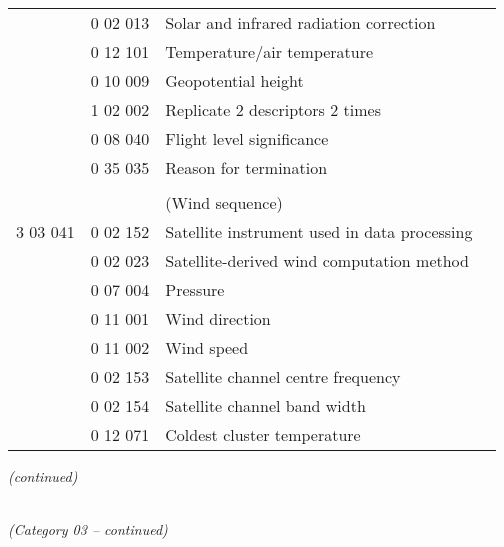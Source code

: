\begin{longtable}[]{@{}llll@{}}
& 0 02 013 & Solar and infrared radiation correction &\tabularnewline
& 0 12 101 & Temperature/air temperature &\tabularnewline
& 0 10 009 & Geopotential height &\tabularnewline
& 1 02 002 & Replicate 2 descriptors 2 times &\tabularnewline
& 0 08 040 & Flight level significance &\tabularnewline
& 0 35 035 & Reason for termination &\tabularnewline
& & &\tabularnewline
& & (Wind sequence) &\tabularnewline
3 03 041 & 0 02 152 & Satellite instrument used in data processing &\tabularnewline
& 0 02 023 & Satellite-derived wind computation method &\tabularnewline
& 0 07 004 & Pressure &\tabularnewline
& 0 11 001 & Wind direction &\tabularnewline
& 0 11 002 & Wind speed &\tabularnewline
& 0 02 153 & Satellite channel centre frequency &\tabularnewline
& 0 02 154 & Satellite channel band width &\tabularnewline
& 0 12 071 & Coldest cluster temperature &\tabularnewline
\bottomrule
\end{longtable}

\emph{(continued)}

\emph{\\
(Category 03 -- continued)}

